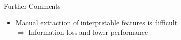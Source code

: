 \documentclass[11pt,compress,t,notes=noshow, aspectratio=169, xcolor=table]{beamer}
\begin{document}
\begin{frame}{Further Comments}
\begin{itemize}
\begin{itemize}
    \item Manual extraction of interpretable features is difficult \\$\Rightarrow$ Information loss and lower performance
\end{itemize}
    \end{itemize}
    
    

\end{frame}
\end{document}
